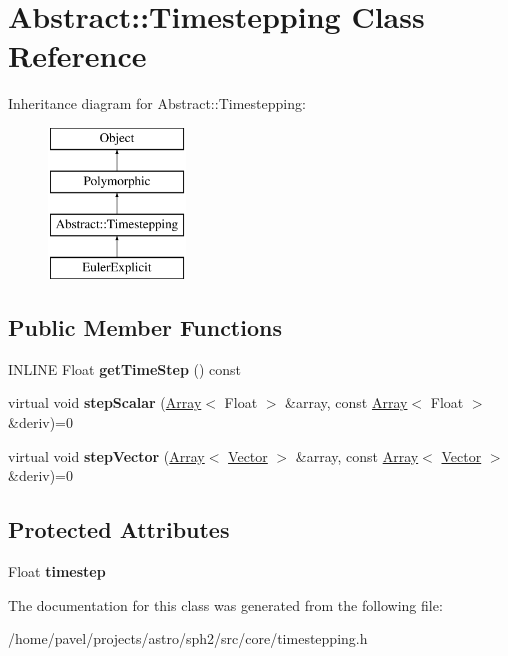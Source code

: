 \hypertarget{classAbstract_1_1Timestepping}{}\section{Abstract\+:\+:Timestepping Class Reference}
\label{classAbstract_1_1Timestepping}
Inheritance diagram for Abstract\+:\+:Timestepping\+:\begin{figure}[H]
\begin{center}
\leavevmode
\includegraphics[height=4.000000cm]{classAbstract_1_1Timestepping}
\end{center}
\end{figure}
\subsection*{Public Member Functions}
\begin{DoxyCompactItemize}
\item 
\hypertarget{classAbstract_1_1Timestepping_a1d810cb944d83f76f2b4f8a3945734a5}{}\label{classAbstract_1_1Timestepping_a1d810cb944d83f76f2b4f8a3945734a5} 
I\+N\+L\+I\+NE Float {\bfseries get\+Time\+Step} () const
\item 
\hypertarget{classAbstract_1_1Timestepping_a611d6d2f9d391cfaa311f28ce70743d9}{}\label{classAbstract_1_1Timestepping_a611d6d2f9d391cfaa311f28ce70743d9} 
virtual void {\bfseries step\+Scalar} (\hyperlink{classArray}{Array}$<$ Float $>$ \&array, const \hyperlink{classArray}{Array}$<$ Float $>$ \&deriv)=0
\item 
\hypertarget{classAbstract_1_1Timestepping_a3d15bc9243461744ea39cd31b05b0b9d}{}\label{classAbstract_1_1Timestepping_a3d15bc9243461744ea39cd31b05b0b9d} 
virtual void {\bfseries step\+Vector} (\hyperlink{classArray}{Array}$<$ \hyperlink{classBasicVector}{Vector} $>$ \&array, const \hyperlink{classArray}{Array}$<$ \hyperlink{classBasicVector}{Vector} $>$ \&deriv)=0
\end{DoxyCompactItemize}
\subsection*{Protected Attributes}
\begin{DoxyCompactItemize}
\item 
\hypertarget{classAbstract_1_1Timestepping_a7106fab04fd5784fca0b394079039583}{}\label{classAbstract_1_1Timestepping_a7106fab04fd5784fca0b394079039583} 
Float {\bfseries timestep}
\end{DoxyCompactItemize}


The documentation for this class was generated from the following file\+:\begin{DoxyCompactItemize}
\item 
/home/pavel/projects/astro/sph2/src/core/timestepping.\+h\end{DoxyCompactItemize}
